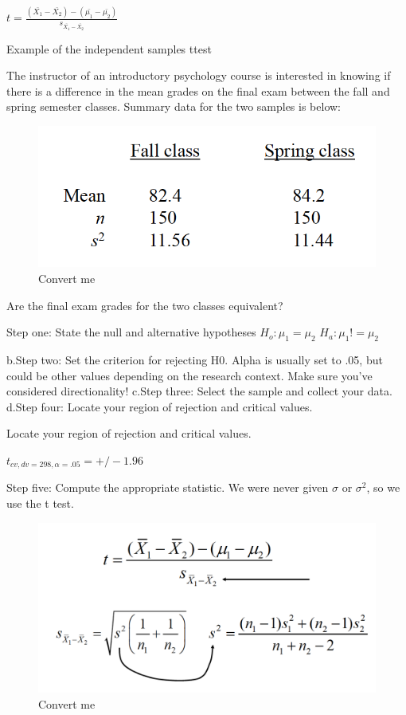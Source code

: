 \documentclass[]{book}
\theoremstyle{definition}
\theoremstyle{definition}
\theoremstyle{definition}
\theoremstyle{remark}
\begin{document}
\(t = \frac{(\bar{X_1}-\bar{X_2})-(\bar{\mu_1}-\bar{\mu_2})}{s_{\bar{X_1}-\bar{X_2}}}\)

Example of the independent samples ttest

The instructor of an introductory psychology course is interested in
knowing if there is a difference in the mean grades on the final exam
between the fall and spring semester classes. Summary data for the two
samples is below:

\begin{figure}
\centering
\includegraphics{img/hickssampling13.png}
\caption{Convert me}
\end{figure}

Are the final exam grades for the two classes equivalent?

Step one: State the null and alternative hypotheses
\(H_o:\mu_1 = \mu_2\) \(H_a:\mu_1 != \mu_2\)

b.Step two: Set the criterion for rejecting H0. Alpha is usually set to
.05, but could be other values depending on the research context. Make
sure you've considered directionality! c.Step three: Select the sample
and collect your data. d.Step four: Locate your region of rejection and
critical values.

Locate your region of rejection and critical values.

\(t_{cv,dv=298, \alpha=.05}= +/- 1.96\)

Step five: Compute the appropriate statistic. We were never given
\(\sigma\) or \(\sigma^2\), so we use the t test.

\begin{figure}
\centering
\includegraphics{img/hickssampling14.png}
\caption{Convert me}
\end{figure}
\end{document}
